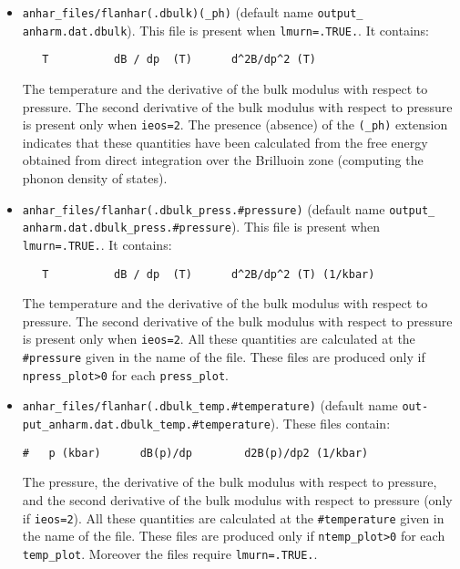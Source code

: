 \documentclass[12pt,a4paper,twoside]{report}
\begin{document}
\begin{itemize}
\item \texttt{anhar\_files/flanhar(.dbulk)(\_ph)} 
(default name \texttt{output\_}\\ \texttt{anharm.dat.dbulk}).
This file is present when \texttt{lmurn=.TRUE.}. It contains:
\begin{verbatim}
   T          dB / dp  (T)      d^2B/dp^2 (T) 
\end{verbatim}
The temperature and the derivative of the bulk modulus with respect 
to pressure. The second derivative of the bulk modulus with respect
to pressure is present only when \texttt{ieos=2}.
The presence (absence) of the \texttt{(\_ph)} extension indicates that these 
quantities have been calculated from the free energy obtained from direct 
integration over the Brilluoin zone (computing the phonon density of states). 

\item \texttt{anhar\_files/flanhar(.dbulk\_press.\#pressure)} 
(default name \texttt{output\_}\\ \texttt{anharm.dat.dbulk\_press.\#pressure}).
This file is present when \texttt{lmurn=.TRUE.}. It contains:
\begin{verbatim}
   T          dB / dp  (T)      d^2B/dp^2 (T) (1/kbar)
\end{verbatim}
The temperature and the derivative of the bulk modulus with respect 
to pressure. The second derivative of the bulk modulus with respect
to pressure is present only when \texttt{ieos=2}.
All these quantities are calculated at the \texttt{\#pressure} given
in the name of the file.
These files are produced only if \texttt{npress\_plot>0} for each
\texttt{press\_plot}. 

\item \texttt{anhar\_files/flanhar(.dbulk\_temp.\#temperature)}
(default name \texttt{out-} \texttt{put\_anharm.dat.dbulk\_temp.\#temperature}).
These files contain:
\begin{verbatim}
#   p (kbar)      dB(p)/dp        d2B(p)/dp2 (1/kbar)
\end{verbatim}
The pressure, the derivative of the bulk modulus with respect to pressure,
and the second derivative of the bulk modulus with respect to pressure
(only if \texttt{ieos=2}).
All these quantities are calculated at the \texttt{\#temperature} given
in the name of the file.
These files are produced only if \texttt{ntemp\_plot>0} for each
\texttt{temp\_plot}. Moreover the files require \texttt{lmurn=.TRUE.}.


\end{itemize}
\end{document}
